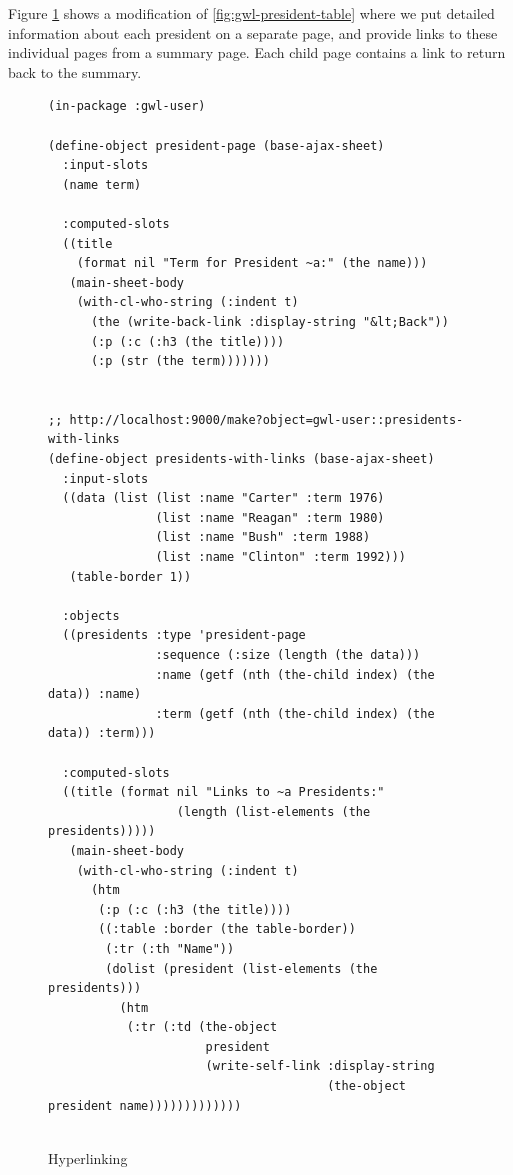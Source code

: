 \documentclass [11pt]{book}
\begin{document}
Figure 
\ref{fig:gwl-president-links} shows a modification of 
\ref{fig:gwl-president-table}
where we put detailed information about each president on a separate page, and provide links to these individual
pages from a summary page.  Each child page contains a link to return back to the summary.
\begin{figure}
\begin{lrbox}{\boxedverb}
\begin{minipage}{\linewidth}
{\small

\begin{verbatim}(in-package :gwl-user)

(define-object president-page (base-ajax-sheet)
  :input-slots
  (name term)

  :computed-slots
  ((title
    (format nil "Term for President ~a:" (the name)))
   (main-sheet-body
    (with-cl-who-string (:indent t)
      (the (write-back-link :display-string "&lt;Back"))
      (:p (:c (:h3 (the title))))
      (:p (str (the term)))))))


;; http://localhost:9000/make?object=gwl-user::presidents-with-links
(define-object presidents-with-links (base-ajax-sheet)
  :input-slots
  ((data (list (list :name "Carter" :term 1976)
               (list :name "Reagan" :term 1980)
               (list :name "Bush" :term 1988)
               (list :name "Clinton" :term 1992)))
   (table-border 1))

  :objects
  ((presidents :type 'president-page
               :sequence (:size (length (the data)))
               :name (getf (nth (the-child index) (the data)) :name)
               :term (getf (nth (the-child index) (the data)) :term)))

  :computed-slots
  ((title (format nil "Links to ~a Presidents:"
                  (length (list-elements (the presidents)))))
   (main-sheet-body
    (with-cl-who-string (:indent t)
      (htm
       (:p (:c (:h3 (the title))))
       ((:table :border (the table-border))
        (:tr (:th "Name"))
        (dolist (president (list-elements (the presidents)))
          (htm      
           (:tr (:td (the-object
                      president
                      (write-self-link :display-string
                                       (the-object president name)))))))))))))


\end{verbatim}}
\end{minipage}
\end{lrbox}
\fbox{\usebox{\boxedverb}}

\caption{Hyperlinking}

\label{fig:gwl-president-links}

\end{figure}
\end{document}
